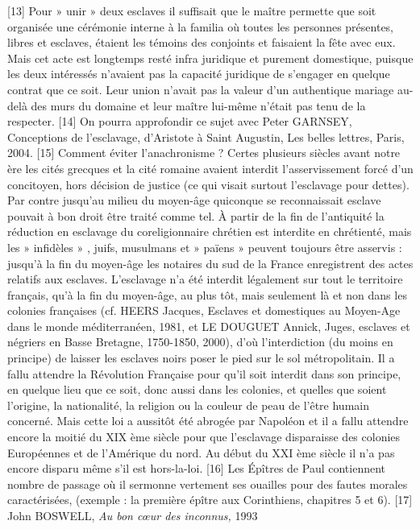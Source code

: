 [13] Pour » unir » deux esclaves il suffisait que le maître permette que soit organisée une cérémonie interne à la familia où toutes les personnes présentes, libres et esclaves, étaient les témoins des conjoints et faisaient la fête avec eux. Mais cet acte est longtemps resté infra juridique et purement domestique, puisque les deux intéressés n'avaient pas la capacité juridique de s'engager en quelque contrat que ce soit. Leur union n'avait pas la valeur d'un authentique mariage au-delà des murs du domaine et leur maître lui-même n'était pas tenu de la respecter. 
[14] On pourra approfondir ce sujet avec Peter GARNSEY, Conceptions de l'esclavage, d'Aristote à Saint Augustin, Les belles lettres, Paris, 2004.
[15] Comment éviter l'anachronisme ? Certes plusieurs siècles avant notre ère les cités grecques et la cité romaine avaient interdit l'asservissement forcé d'un concitoyen, hors décision de justice (ce qui visait surtout l'esclavage pour dettes). Par contre jusqu'au milieu du moyen-âge quiconque se reconnaissait esclave pouvait à bon droit être traité comme tel. À partir de la fin de l'antiquité la réduction en esclavage du coreligionnaire chrétien est interdite en chrétienté, mais les » infidèles » , juifs, musulmans et » païens » peuvent toujours être asservis : jusqu'à la fin du moyen-âge les notaires du sud de la France enregistrent des actes relatifs aux esclaves. L'esclavage n'a été interdit légalement sur tout le territoire français, qu'à la fin du moyen-âge, au plus tôt, mais seulement là et non dans les colonies françaises (cf. HEERS Jacques, Esclaves et domestiques au Moyen-Age dans le monde méditerranéen, 1981, et LE DOUGUET Annick, Juges, esclaves et négriers en Basse Bretagne, 1750-1850, 2000), d'où l'interdiction (du moins en principe) de laisser les esclaves noirs poser le pied sur le sol métropolitain. Il a fallu attendre la Révolution Française pour qu'il soit interdit dans son principe, en quelque lieu que ce soit, donc aussi dans les colonies, et quelles que soient l'origine, la nationalité, la religion ou la couleur de peau de l'être humain concerné. Mais cette loi a aussitôt été abrogée par Napoléon et il a fallu attendre encore la moitié du XIX ème siècle pour que l'esclavage disparaisse des colonies Européennes et de l'Amérique du nord. Au début du XXI ème siècle il n'a pas encore disparu même s'il est hors-la-loi.
[16] Les Épîtres de Paul contiennent nombre de passage où il sermonne vertement ses ouailles pour des fautes morales caractérisées, (exemple : la première épître aux Corinthiens, chapitres 5 et 6).
[17] John BOSWELL, \emph{Au bon cœur des inconnus,} 1993